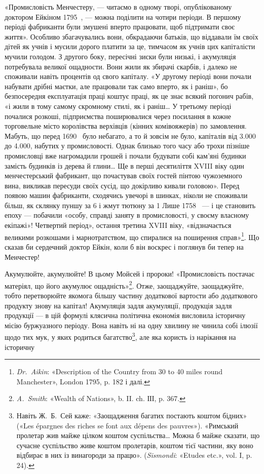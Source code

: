 
«Промисловість Менчестеру, — читаємо в одному творі, опублікованому
доктором Ейкіном 1795~, — можна поділити на
чотири періоди. В першому періоді фабриканти були змушені
вперто працювати, щоб підтримати своє життя». Особливо збагачувались
вони, обкрадаючи батьків, що віддавали їм своїх дітей
як учнів і мусили дорого платити за це, тимчасом як учнів цих
капіталісти мучили голодом. З другого боку, пересічні зиски
були низькі, і акумуляція потребувала великої ощадности.
Вони жили як збирачі скарбів, і далеко не споживали навіть
процентів од свого капіталу. «У другому періоді вони почали
набувати дрібні маєтки, але працювали так само вперто, як і
раніш», бо безпосередня експлуатація праці коштує праці, як
це знає всякий погонич рабів, «і жили в тому самому скромному
стилі, як і раніш\dots{} У третьому періоді почалися розкоші, підприємства
поширювалися через посилання в кожне торговельне
місто королівства верхівців (кінних комівояжерів) по замовлення.
Мабуть, що перед 1690~ було небагато, а то й зовсім не було,
капіталів від \num{3.000} до \num{4.000}, набутих у промисловості.
Однак близько того часу або трохи пізніше промисловці
вже нагромадили грошей і почали будувати собі кам’яні
будинки замість будинків із дерева й глини\dots{} Ще в перші десятиліття
XVIII віку один менчестерський фабрикант, що почастував
своїх гостей пінтою чужоземного вина, викликав пересуди
своїх сусід, що докірливо кивали головою». Перед появою машин
фабриканти, сходячись увечорі в шинках, ніколи не споживали
більш, як склянку пуншу за 6 і жмут тютюну за 1
Лише 1758~ — і це становить епоху — побачили «особу, справді
заняту в промисловості, у своєму власному екіпажі»! Четвертий
період», остання третина XVIII віку, «відзначається великими
розкошами і марнотратством, що спиралися на поширення
справ»\footnote{
\emph{Dr.~Aikin}: «Description of the Country from 30 to 40 miles round
Manchester», London 1795, p. 182 і далі.
}. Що сказав би сердечний доктор Ейкін, коли б він
воскрес і поглянув би тепер на Менчестер!

Акумулюйте, акумулюйте! В цьому Мойсей і пророки! «Промисловість
постачає матеріял, що його акумулює ощадність»\footnote{
\emph{A.~Smith}: «Wealth of Nations», b. II. ch. ІІІ, p. 367.
}.
Отже, заощаджуйте, заощаджуйте, тобто перетворюйте якомога
більшу частину додаткової вартости або додаткового продукту
знову на капітал! Акумуляція задля акумуляції, продукція
задля продукції — в цій формулі клясична політична економія
висловила історичну місію буржуазного періоду. Вона навіть ні
на одну хвилину не чинила собі ілюзії щодо тих мук, у яких родиться
багатство\footnote{
Навіть Ж.~Б.~Сей каже: «Заощадження багатих постають коштом
бідних» («Les épargnes des riches se font aux dépens des pauvres»). «Римський
пролетар жив майже цілком коштом суспільства\dots{} Можна б майже
сказати, що сучасне суспільство живе коштом пролетарів, коштом тієї
частини, яку воно відбирає в них із винагороди за працю». (\emph{Sismondi}:
«Etudes etc.», vol. I, p. 24).
}, але яка користь із нарікання на історичну
\parbreak{}  %
